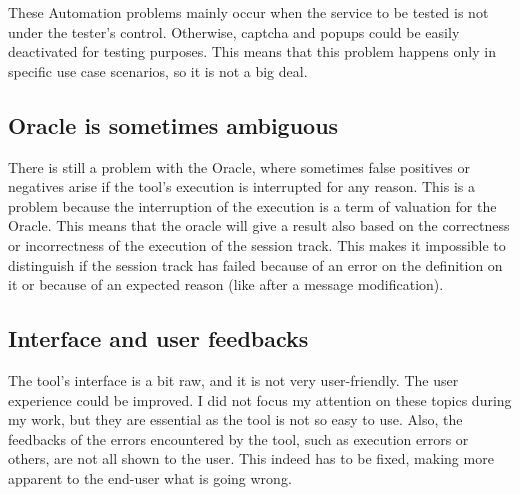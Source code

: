 These Automation problems mainly occur when the service to be tested is not under the tester's control. Otherwise, captcha and popups could be easily deactivated for testing purposes. This means that this problem happens only in specific use case scenarios, so it is not a big deal.

\subsection{Oracle is sometimes ambiguous}
There is still a problem with the Oracle, where sometimes false positives or negatives arise if the tool's execution is interrupted for any reason. This is a problem because the interruption of the execution is a term of valuation for the Oracle. This means that the oracle will give a result also based on the correctness or incorrectness of the execution of the \gls{session track}. This makes it impossible to distinguish if the \gls{session track} has failed because of an error on the definition on it or because of an expected reason (like after a message modification).

\subsection{Interface and user feedbacks}
The tool's interface is a bit raw, and it is not very user-friendly. The user experience could be improved. I did not focus my attention on these topics during my work, but they are essential as the tool is not so easy to use. Also, the feedbacks of the errors encountered by the tool, such as execution errors or others, are not all shown to the user. This indeed has to be fixed, making more apparent to the end-user what is going wrong.





